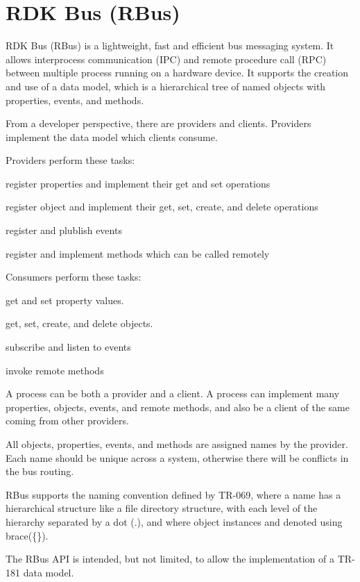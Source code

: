 \chapter{RDK Bus (RBus) }
\hypertarget{index}{}\label{index}
RDK Bus (RBus) is a lightweight, fast and efficient bus messaging system. It allows interprocess communication (IPC) and remote procedure call (RPC) between multiple process running on a hardware device. It supports the creation and use of a data model, which is a hierarchical tree of named objects with properties, events, and methods.

From a developer perspective, there are providers and clients. Providers implement the data model which clients consume.

Providers perform these tasks:
\begin{DoxyItemize}
\item register properties and implement their get and set operations
\item register object and implement their get, set, create, and delete operations
\item register and plublish events
\item register and implement methods which can be called remotely
\end{DoxyItemize}

Consumers perform these tasks:
\begin{DoxyItemize}
\item get and set property values.
\item get, set, create, and delete objects.
\item subscribe and listen to events
\item invoke remote methods
\end{DoxyItemize}

A process can be both a provider and a client. A process can implement many properties, objects, events, and remote methods, and also be a client of the same coming from other providers.

All objects, properties, events, and methods are assigned names by the provider. Each name should be unique across a system, otherwise there will be conflicts in the bus routing.

RBus supports the naming convention defined by TR-\/069, where a name has a hierarchical structure like a file directory structure, with each level of the hierarchy separated by a dot (\textquotesingle{}.\textquotesingle{}), and where object instances and denoted using brace(\{\}).

The RBus API is intended, but not limited, to allow the implementation of a TR-\/181 data model. 